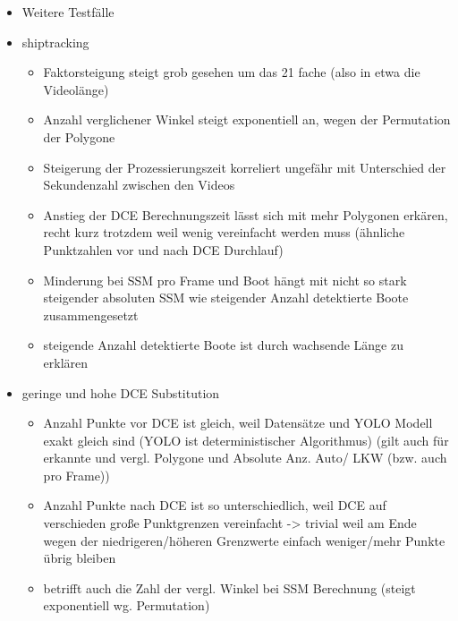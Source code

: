 {\begin{itemize}
\begin{itemize}
			\item Verdoppelung der Absoluten SSM bei LKW so hoch, weil LKW mehr Punkte haben, bei 8m und 8x nicht mehr so starke Steigung
			\item Da alle anderen Werte vom SSM abhängen ist dies auch bei den anderen Werten der Fall
			\item Bei dem Zug/Bus ist die Verringerung durch die besseren Modelle zu erklären, da die Modelle genauer und besser Autos/LKW detektieren, ist insbesondere bei 8x zu sehen wo nur noch 1 Zug falsch detektiert wird und kein Bus mehr (Folgerung besser trainiertes Modell gleich bessere Erkennungsleistung -> Logisch)
		\end{itemize}
		\item Weitere Testfälle
		\item shiptracking
		\begin{itemize}
			\item Faktorsteigung steigt grob gesehen um das 21 fache (also in etwa die Videolänge)
			\item Anzahl verglichener Winkel steigt exponentiell an, wegen der Permutation der Polygone
			\item Steigerung der Prozessierungszeit korreliert ungefähr mit Unterschied der Sekundenzahl zwischen den Videos
			\item Anstieg der DCE Berechnungszeit lässt sich mit mehr Polygonen erkären, recht kurz trotzdem weil wenig vereinfacht werden muss (ähnliche Punktzahlen vor und nach DCE Durchlauf)
			\item Minderung bei SSM pro Frame und Boot hängt mit nicht so stark steigender absoluten SSM wie steigender Anzahl detektierte Boote zusammengesetzt
			\item steigende Anzahl detektierte Boote ist durch wachsende Länge zu erklären
		\end{itemize}
		\item geringe und hohe DCE Substitution
		\begin{itemize}
			\item Anzahl Punkte vor DCE ist gleich, weil Datensätze und YOLO Modell exakt gleich sind (YOLO ist deterministischer Algorithmus) (gilt auch für erkannte und vergl. Polygone und Absolute Anz. Auto/ LKW (bzw. auch pro Frame))
			\item Anzahl Punkte nach DCE ist so unterschiedlich, weil DCE auf verschieden große Punktgrenzen vereinfacht -> trivial weil am Ende wegen der niedrigeren/höheren Grenzwerte einfach weniger/mehr Punkte übrig bleiben
			\item betrifft auch die Zahl der vergl. Winkel bei SSM Berechnung (steigt exponentiell wg. Permutation)

\end{itemize}
\end{itemize}}
